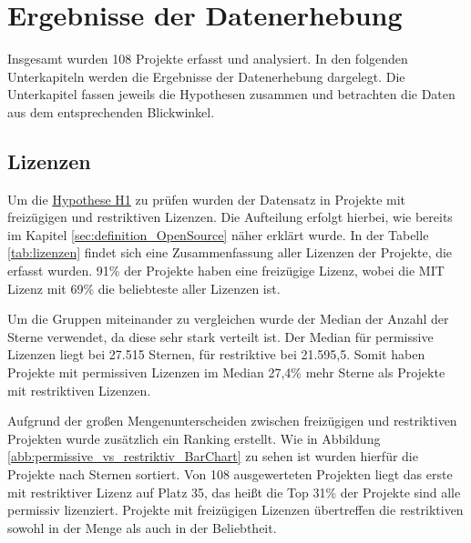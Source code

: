 \newpage %
\chapter{Ergebnisse der Datenerhebung}

Insgesamt wurden 108 Projekte erfasst und analysiert. 
In den folgenden Unterkapiteln werden die Ergebnisse der Datenerhebung dargelegt. Die Unterkapitel 
fassen jeweils die Hypothesen zusammen und betrachten die Daten aus dem entsprechenden Blickwinkel.

\section{Lizenzen} \label{sec:Ergebnisse_Datenerhebung_Lizenzen}

\bigskip
\noindent
Um die \hyperref[H:1]{Hypothese H1} zu prüfen wurden der Datensatz in Projekte mit freizügigen und
restriktiven Lizenzen. Die Aufteilung erfolgt hierbei, wie bereits im Kapitel \ref{sec:definition_OpenSource}
näher erklärt wurde.
In der Tabelle \ref{tab:lizenzen} findet sich eine Zusammenfassung aller Lizenzen der
Projekte, die erfasst wurden. 91\% der Projekte haben eine freizügige Lizenz, wobei die MIT Lizenz mit 69\%
die beliebteste aller Lizenzen ist.

Um die Gruppen miteinander zu vergleichen wurde der Median der Anzahl der Sterne verwendet, da diese
sehr stark verteilt ist. Der Median für permissive Lizenzen liegt bei 27.515 Sternen, für
restriktive bei 21.595,5. Somit haben Projekte mit permissiven Lizenzen im Median 27,4\% mehr Sterne
als Projekte mit restriktiven Lizenzen.

Aufgrund der großen Mengenunterscheiden zwischen freizügigen und restriktiven Projekten wurde
zusätzlich ein Ranking erstellt. Wie in Abbildung \ref{abb:permissive_vs_restriktiv_BarChart} zu sehen
ist wurden hierfür die Projekte nach Sternen sortiert. Von 108 ausgewerteten Projekten liegt das erste
mit restriktiver Lizenz auf Platz 35, das heißt die Top 31\% der Projekte sind alle 
permissiv lizenziert. Projekte mit freizügigen Lizenzen übertreffen die restriktiven sowohl in der Menge 
als auch in der Beliebtheit.
 







